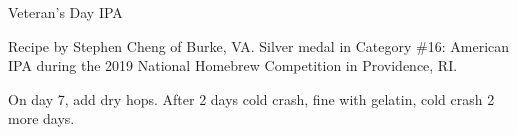 \begin{recipe}{Veteran's Day IPA}

\begin{aboutblock}
Recipe by Stephen Cheng of Burke, VA. Silver medal in Category \#16: American
IPA during the 2019 National Homebrew Competition in Providence, RI.
\sourceaha
\end{aboutblock}


\begin{methodandtiming}
 
\begin{mashsteps}
\end{mashsteps}

\begin{fermentationsteps}
\end{fermentationsteps}

\begin{directions}
On day 7, add dry hops. After 2 days cold crash, fine with gelatin, cold crash 2
more days.
\end{directions}

\end{methodandtiming}

\recipebreak

\begin{ingredientsblock}

\begin{malts}
\end{malts}

\begin{hops}
\end{hops}


\end{ingredientsblock}

\end{recipe}

